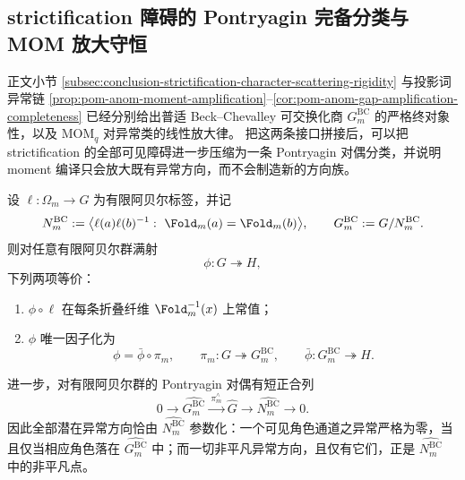 \subsection{strictification 障碍的 Pontryagin 完备分类与 MOM 放大守恒}

正文小节 \ref{subsec:conclusion-strictification-character-scattering-rigidity}
与投影词异常链
\ref{prop:pom-anom-moment-amplification}--\ref{cor:pom-anom-gap-amplification-completeness}
已经分别给出普适 Beck--Chevalley 可交换化商
\(
G_m^{\mathrm{BC}}
\)
的严格终对象性，以及 \(\mathrm{MOM}_q\) 对异常类的线性放大律。
把这两条接口拼接后，可以把 strictification 的全部可见障碍进一步压缩为一条 Pontryagin 对偶分类，并说明 moment 编译只会放大既有异常方向，而不会制造新的方向族。

\begin{theorem}\label{thm:derived-strictification-pontryagin-complete-classification}
设 \(\ell:\Omega_m\to G\) 为有限阿贝尔标签，并记
\[
N_m^{\mathrm{BC}}
:=
\bigl\langle
\ell(a)\ell(b)^{-1}:\ \Fold_m(a)=\Fold_m(b)
\bigr\rangle,
\qquad
G_m^{\mathrm{BC}}:=G/N_m^{\mathrm{BC}}.
\]
则对任意有限阿贝尔群满射
\[
\phi:G\twoheadrightarrow H,
\]
下列两项等价：
\begin{enumerate}
\normalfont
  \item \(\phi\circ\ell\) 在每条折叠纤维 \(\Fold_m^{-1}(x)\) 上常值；
  \item \(\phi\) 唯一因子化为
  \[
  \phi=\bar\phi\circ\pi_m,
  \qquad
  \pi_m:G\twoheadrightarrow G_m^{\mathrm{BC}},
  \qquad
  \bar\phi:G_m^{\mathrm{BC}}\twoheadrightarrow H.
  \]
\end{enumerate}
进一步，对有限阿贝尔群的 Pontryagin 对偶有短正合列
\[
0\longrightarrow \widehat{G_m^{\mathrm{BC}}}
\xrightarrow{\ \pi_m^\wedge\ }
\widehat G
\longrightarrow
\widehat{N_m^{\mathrm{BC}}}
\longrightarrow 0.
\]
因此全部潜在异常方向恰由
\(
\widehat{N_m^{\mathrm{BC}}}
\)
参数化：一个可见角色通道之异常严格为零，当且仅当相应角色落在
\(
\widehat{G_m^{\mathrm{BC}}}
\)
中；而一切非平凡异常方向，且仅有它们，正是
\(
\widehat{N_m^{\mathrm{BC}}}
\)
中的非平凡点。
\end{theorem}

